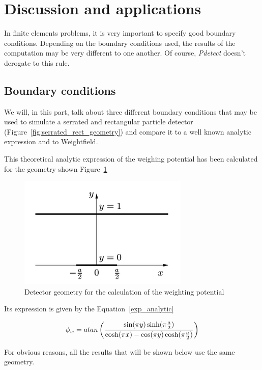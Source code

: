 \documentclass[11pt]{article}
\begin{document}
\section{Discussion and applications}

	In finite elements problems, it is very important to specify good boundary conditions.
	Depending on the boundary conditions used, the results of the computation may be very
	different to one another. Of course, \textit{Pdetect} doesn't derogate to this rule.

	\subsection{Boundary conditions}

		We will, in this part, talk about three different boundary conditions that may be used
		to simulate a serrated and rectangular particle detector
		(Figure~\ref{fig:serrated_rect_geometry}) and compare it to a well known analytic
		expression and to Weightfield.

		This theoretical analytic expression of the weighing potential has been calculated for
		the geometry shown Figure~\ref{fig:analytic}

		\begin{figure}[H]
			\center
			\includegraphics[scale=0.5]{images/boundary_conditions/analytic.png}
			\caption{Detector geometry for the calculation of the weighting
				potential~\cite{pixeldetector}}
			\label{fig:analytic}
		\end{figure}

		Its expression is given by the Equation~\ref{exp_analytic}

		\begin{equation}
			\phi_w = atan\left({\sin(\pi y)\sinh(\pi {a\over{2}})\over
					{\cosh(\pi x)-\cos(\pi y)\cosh(\pi {a\over{2}})}}\right)
			\label{exp_analytic}
		\end{equation}

		For obvious reasons, all the results that will be shown below use the same geometry.
\end{document}
